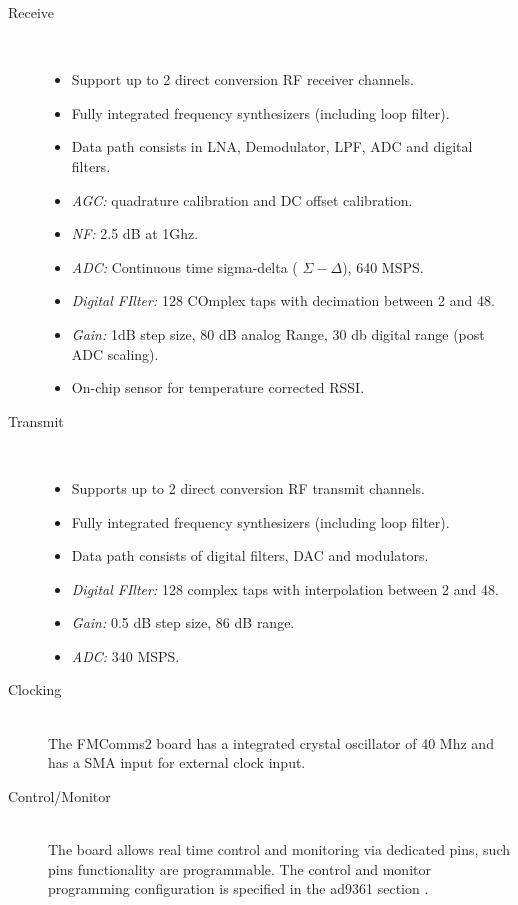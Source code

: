 \begin{description}
	\item[Receive] \hfill \\
	\begin{itemize}
		\item Support up to 2 direct conversion RF receiver channels.
		\item Fully integrated frequency synthesizers (including loop filter).
		\item Data path consists in LNA, Demodulator, LPF, ADC and digital filters.
		\item \textit{AGC:} quadrature calibration and DC offset calibration.
		\item \textit{NF:} 2.5 dB at 1Ghz.
		\item \textit{ADC:} Continuous time sigma-delta ( $\Sigma - \Delta$), 640 MSPS.
		\item \textit{Digital FIlter:} 128 COmplex taps with decimation between 2 and 48.
		\item \textit{Gain:} 1dB step size, 80 dB analog Range, 30 db digital range (post ADC scaling).
		\item On-chip sensor for temperature corrected RSSI.
	\end{itemize}

	\item[Transmit] \hfill \\
\begin{itemize}
		\item Supports up to 2 direct conversion RF transmit channels.
		\item Fully integrated frequency synthesizers (including loop filter).
\item Data path consists of digital filters, DAC and modulators.
		\item \textit{Digital FIlter:} 128 complex taps with interpolation between 2 and 48.
		\item \textit{Gain:} 0.5 dB step size, 86 dB range.
		\item \textit{ADC:} 340 MSPS.
	\end{itemize}

	\item[Clocking] \hfill \\
		The FMComms2 board has a integrated crystal oscillator of 40 Mhz and has a SMA
input for external clock input.

	\item[Control/Monitor] \hfill \\
		The board allows real time control and monitoring via dedicated pins, such pins
functionality are programmable. The control and monitor programming
configuration is specified in the ad9361 section \cite{sec:ad9361}.

\end{description}

